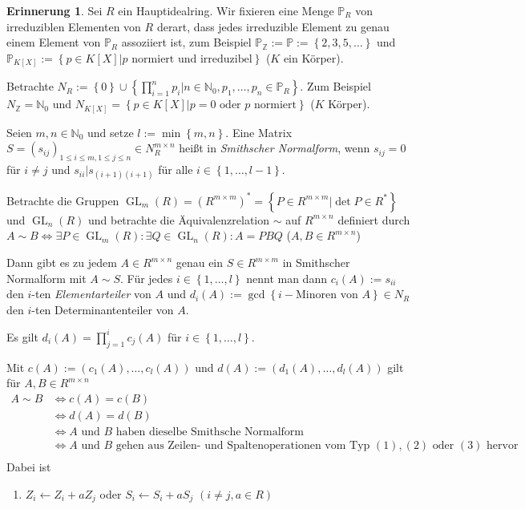 \documentclass[
twoside=semi,
fontsize=12,
DIV=12, 
cleardoublepage=current,
leqno,
headings=optiontoheadandtoc, 
toc=idx
]{scrbook}
\newcommand{\N}{\mathbb{N}}
\newcommand{\Z}{\mathbb{Z}}
\renewcommand{\P}{\mathbb{P}}
\newcommand{\set}[1]{\left\{ #1 \right\}}
\DeclareMathOperator{\GL}{GL}
\theoremstyle{definition}
\newtheorem{erinnerung}[definition]{Erinnerung}
\begin{document}
	\begin{erinnerung}\label{1.6.4}
		Sei $R$ ein Hauptidealring. Wir fixieren eine Menge $\P_R$ von irreduziblen Elementen von $R$ derart, dass jedes irreduzible Element zu genau einem Element von $\P_R$ assoziiert ist, zum Beispiel $\P_\Z := \P := \set{2,3,5,\dots}$ und $\P_{K[X]} := \set{p \in K[X]|p \textrm{ normiert und irreduzibel}}$ ($K$ ein K\"orper).
		
		Betrachte $N_R:= \set{0} \cup \set{\prod_{i=1}^np_i| n \in \N_0, p_1, \dots, p_n \in \P_R}$. Zum Beispiel $N_\Z = \N_0$ und $N_{K[X]} = \set{p\in K[X]|p= 0 \textrm{ oder } p \textrm{ normiert}}$ ($K$ K\"orper).
		
		Seien $m,n \in \N_0$ und setze $l := \min \set{m, n}$. Eine Matrix $S=(s_{ij})_{1\leq i \leq m, 1 \leq j \leq n} \in N_R^{m\times n}$ hei\ss t in \emph{Smithscher Normalform}, wenn $s_{ij} = 0$ f\"ur $i\neq j$ und $s_{ii} | s_{(i+1)(i+1)}$ f\"ur alle $i \in \set{1, \dots, l-1}$. 
		
		Betrachte die Gruppen $\GL_m(R) = (R^{m\times m})^* = \set{P \in R^{m \times m}| \det P \in R^*}$ und $\GL_n(R)$ und betrachte die \"Aquivalenzrelation $\sim$ auf $R^{m\times n}$ definiert durch
		$A \sim B \Leftrightarrow \exists P \in \GL_m(R): \exists Q \in \GL_n(R): A=PBQ$ ($A, B \in R^{m \times n}$)
		
		
		Dann gibt es zu jedem $A \in R^{m \times n}$ genau ein $S \in R^{m\times m}$ in Smithscher Normalform mit $A \sim S$.
		F\"ur jedes $i \in \set{1, \dots, l}$ nennt man dann $c_i(A) := s_{ii}$ den $i$-ten \emph{Elementarteiler} von $A$ und $d_i(A) := \gcd\set{i-\textrm{Minoren von } A} \in N_R$ den $i$-ten Determinantenteiler von $A$.
		
		Es gilt $d_i(A) = \prod_{j=1}^i c_j(A)$ f\"ur $i \in \set{1, \dots, l}$. 
		
		Mit $c(A) := (c_1(A), \dots, c_l(A))$ und $d(A) := (d_1(A), \dots, d_l(A))$ gilt f\"ur $A, B \in R^{m\times n}$
			\begin{align*}
				A \sim B &\Leftrightarrow c(A) = c(B)\\
				&\Leftrightarrow d(A) = d(B)\\
				&\Leftrightarrow A \textrm{ und } B \textrm{ haben dieselbe Smithsche Normalform}\\
				&\Leftrightarrow A \textrm{ und } B \textrm{ gehen aus Zeilen- und Spaltenoperationen vom Typ } (1), (2) \textrm{ oder } (3) \textrm{ hervor}\\
			\end{align*} 
		Dabei ist 
			\begin{enumerate}[(1)]
				\item $Z_i \gets Z_i + aZ_j$ oder $S_i \gets S_i + aS_j$ \hfill $(i\neq j,a \in R)$
				

\end{enumerate}
\end{erinnerung}
\end{document}
